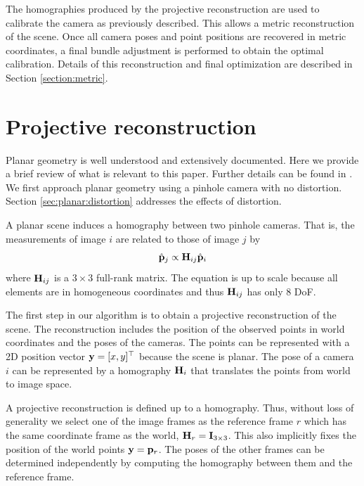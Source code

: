 \documentclass[10pt,twocolumn,letterpaper]{article}
\begin{document}
The homographies produced by the projective reconstruction are used to calibrate the camera as previously described. This allows a metric reconstruction of the scene. Once all camera poses and point positions are recovered in metric coordinates, a final bundle adjustment is performed to obtain the optimal calibration. Details of this reconstruction and final optimization are described in Section \ref{section:metric}.


\section{Projective reconstruction}
\label{sec:projective}

Planar geometry is well understood and extensively documented. Here we provide a brief review of what is relevant to this paper. Further details can be found in \cite{hartley2003}. We first approach planar geometry using a pinhole camera with no distortion. Section \ref{sec:planar:distortion} addresses the effects of distortion.

A planar scene induces a homography between two pinhole cameras. That is, the measurements of image $i$ are related to those of image $j$ by
%
\begin{align}
\hat{\mathbf{p}}_j \propto \mathbf{H}_{ij} \hat{\mathbf{p}}_i 
\label{eq:homography}
\end{align}
%
where $\mathbf{H}_{ij}$ is a $3 \times 3$ full-rank matrix. The equation is up to scale because all elements are in homogeneous coordinates and thus $\mathbf{H}_{ij}$ has only 8 DoF.

The first step in our algorithm is to obtain a projective reconstruction of the scene. The reconstruction includes the position of the observed points in world coordinates and the poses of the cameras. The points can be represented with a 2D position vector $\mathbf{y}=[x,y]^\top$ because the scene is planar. The pose of a camera $i$ can be represented by a homography $\mathbf{H}_i$ that translates the points from world to image space. 

A projective reconstruction is defined up to a homography. Thus, without loss of generality we select one of the image frames as the reference frame $r$ which has the same coordinate frame as the world, \ie $\mathbf{H}_r = \mathbf{I}_{3 \times 3}$. This also implicitly fixes the position of the world points $\mathbf{y}=\mathbf{p}_r$. The poses of the other frames can be determined independently by computing the homography between them and the reference frame.
\end{document}
